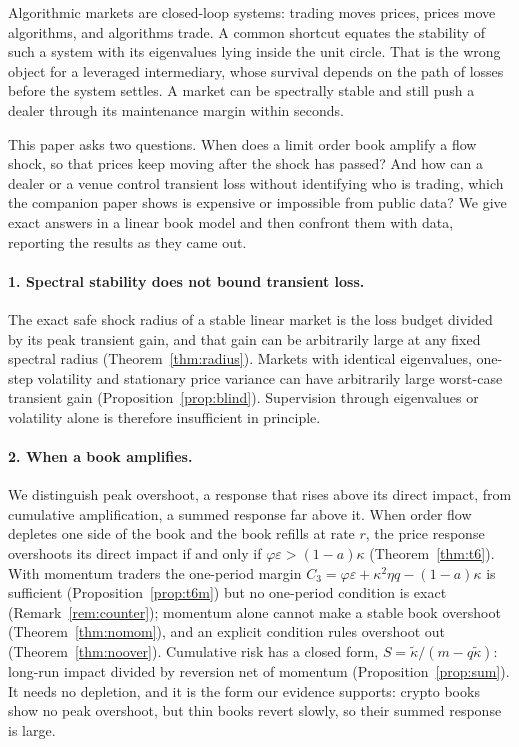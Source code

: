\documentclass[12pt]{article}
\theoremstyle{definition}
\theoremstyle{remark}
\begin{document}
Algorithmic markets are closed-loop systems: trading moves prices, prices move algorithms, and algorithms trade. A common shortcut equates the stability of such a system with its eigenvalues lying inside the unit circle. That is the wrong object for a leveraged intermediary, whose survival depends on the path of losses before the system settles. A market can be spectrally stable and still push a dealer through its maintenance margin within seconds.

This paper asks two questions. When does a limit order book amplify a flow shock, so that prices keep moving after the shock has passed? And how can a dealer or a venue control transient loss without identifying who is trading, which the companion paper \citep{niroula2026} shows is expensive or impossible from public data? We give exact answers in a linear book model and then confront them with data, reporting the results as they came out.

\paragraph{1. Spectral stability does not bound transient loss.} The exact safe shock radius of a stable linear market is the loss budget divided by its peak transient gain, and that gain can be arbitrarily large at any fixed spectral radius (Theorem~\ref{thm:radius}). Markets with identical eigenvalues, one-step volatility and stationary price variance can have arbitrarily large worst-case transient gain (Proposition~\ref{prop:blind}). Supervision through eigenvalues or volatility alone is therefore insufficient in principle.

\paragraph{2. When a book amplifies.} We distinguish peak overshoot, a response that rises above its direct impact, from cumulative amplification, a summed response far above it. When order flow depletes one side of the book and the book refills at rate $r$, the price response overshoots its direct impact if and only if $\varphi\varepsilon>(1-a)\kappa$ (Theorem~\ref{thm:t6}). With momentum traders the one-period margin $C_3=\varphi\varepsilon+\kappa^2\eta q-(1-a)\kappa$ is sufficient (Proposition~\ref{prop:t6m}) but no one-period condition is exact (Remark~\ref{rem:counter}); momentum alone cannot make a stable book overshoot (Theorem~\ref{thm:nomom}), and an explicit condition rules overshoot out (Theorem~\ref{thm:noover}). Cumulative risk has a closed form, $S=\tilde\kappa/(m-q\tilde\kappa)$: long-run impact divided by reversion net of momentum (Proposition~\ref{prop:sum}). It needs no depletion, and it is the form our evidence supports: crypto books show no peak overshoot, but thin books revert slowly, so their summed response is large.
\end{document}
